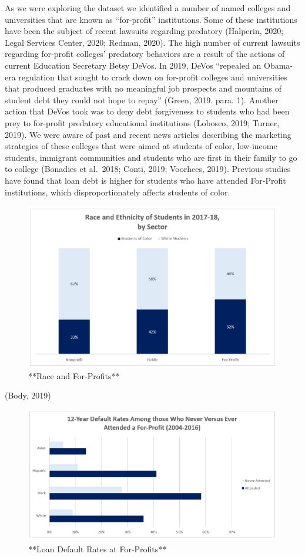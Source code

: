 \documentclass[
]{article}
\begin{document}
As we were exploring the dataset we identified a number of named
colleges and universities that are known as ``for-profit'' institutions.
Some of these institutions have been the subject of recent lawsuits
regarding predatory (Halperin, 2020; Legal Services Center, 2020;
Redman, 2020). The high number of current lawsuits regarding for-profit
colleges' predatory behaviors are a result of the actions of current
Education Secretary Betsy DeVos. In 2019, DeVos ``repealed an Obama-era
regulation that sought to crack down on for-profit colleges and
universities that produced graduates with no meaningful job prospects
and mountains of student debt they could not hope to repay'' (Green,
2019. para. 1). Another action that DeVos took was to deny debt
forgiveness to students who had been prey to for-profit predatory
educational institutions (Lobosco, 2019; Turner, 2019). We were aware of
past and recent news articles describing the marketing strategies of
these colleges that were aimed at students of color, low-income
students, immigrant communities and students who are first in their
family to go to college (Bonadies et al.~2018; Conti, 2019; Voorhees,
2019). Previous studies have found that loan debt is higher for students
who have attended For-Profit institutions, which disproportionately
affects students of color.

\begin{figure}
\includegraphics[width=0.75\linewidth]{chart_2} \caption{**Race and For-Profits**}\label{fig:pressure2}
\end{figure}

(Body, 2019)

\begin{figure}
\includegraphics[width=0.75\linewidth]{chart_1} \caption{**Loan Default Rates at For-Profits**}\label{fig:pressure3}
\end{figure}
\end{document}
